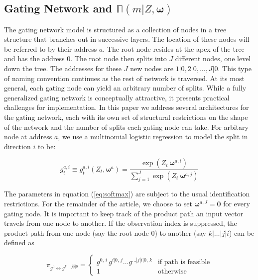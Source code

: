 \documentclass[12pt]{article}
\newcommand{\gateprod}[2]{\pi_{#1 \longleftrightarrow #2}}
\newcommand{\expmixwt}[0]{\mathbb{\Pi}}
\begin{document}
\subsection{Gating Network and $\expmixwt(m | Z, \boldsymbol{\omega})$} \label{subsec:GatingNetwork}

The gating network model is structured as a collection of nodes in a tree
structure that branches out in successive layers. The location of these nodes will
be referred to by their address $a$. The root node resides at the apex of the tree
and has the address $0$. The root node then splits into $J$ different nodes,
one level down the tree. The addresses for these $J$ new nodes are 
$1|0, 2|0, ..., J|0$. This type of naming convention continues as the
rest of network is traversed. At its most general, each gating node can yield an
arbitrary number of splits. While a fully generalized gating network is
conceptually attractive, it presents practical challenges for implementation.
In this paper we address several architectures for the gating network, each
with its own set of structural restrictions on the shape of the network and
the number of splits each gating node can take. For arbitary node at address $a$,
we use a multinomial logistic regression to model the split in direction $i$ to be:

\begin{equation} \label{eq:softmax}
  g^{a,i}_{t} \equiv g^{a,i}_{t}(Z_{t}, \boldsymbol{\omega}^{a}) = \frac{\exp(Z_{t} \ \boldsymbol{\omega}^{a,i})}{\sum^{J}_{j=1} {\exp(Z_{t} \ \boldsymbol{\omega}^{a,j})}}
\end{equation}

The parameters in equation (\ref{eq:softmax}) are subject to the usual
identification restrictions. For the remainder of the article, we choose
to set $\boldsymbol{\omega}^{a,J} = \boldsymbol{0}$ for every gating node.
It is important to keep track of the product path an input vector travels from
one node to another. If the observation index is suppressed, the product path
from one node (say the root node $0$) to another (say $k|\ldots|j|i$)
can be defined as

\begin{equation} \label{eq:gpath}
  \gateprod{g^{0}}{g^{k|\ldots|j|i|0}} =
    \begin{cases} 
       g^{0, \, i} \, g^{i|0, \, j} \ldots g^{\dots|j|i|0, \, k} & \textrm{if path is feasible} \\
       1 & \textrm{otherwise}
    \end{cases}
\end{equation}
\end{document}
